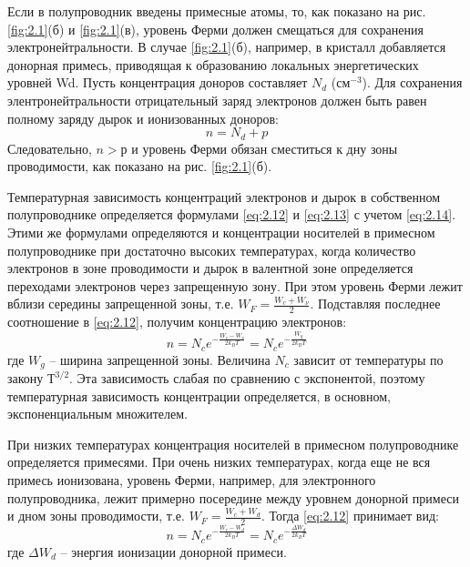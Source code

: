 Если в полупроводник введены примесные атомы, то, как показано на рис. \ref{fig:2.1}(б) и \ref{fig:2.1}(в), уровень Ферми должен смещаться для
сохранения электронейтральности. В случае \ref{fig:2.1}(б), например, в кристалл добавляется донорная примесь, приводящая к
образованию локальных энергетических уровней Wd. Пусть концентрация доноров составляет $N_d$ (см$^{-3}$). Для сохранения
элентронейтральности отрицательный заряд электронов должен быть равен полному заряду дырок и ионизованных доноров:
\begin{equation}
	n = N_d+p
	\label{eq:2.15}
\end{equation}
Следовательно, $n>р$ и уровень Ферми обязан сместиться к дну зоны проводимости, как показано на рис. \ref{fig:2.1}(б).

Температурная зависимость концентраций электронов и дырок в собственном полупроводнике определяется формулами \eqref{eq:2.12} и \eqref{eq:2.13} с учетом
\eqref{eq:2.14}. Этими же формулами определяются и концентрации носителей в примесном полупроводнике при достаточно высоких
температурах, когда количество электронов в зоне проводимости и дырок в валентной зоне определяется переходами
электронов через запрещенную зону. При этом уровень Ферми лежит вблизи середины запрещенной зоны, т.е. $W_F =
\frac{W_c+W_{\nu}}{2}$. Подставляя последнее соотношение в \eqref{eq:2.12}, получим концентрацию электронов:
\begin{equation}
	n=N_{c} e^{-\frac{W_{c}-W_{v}}{2 k_{B} T}}=N_{c} e^{-\frac{W_{g}}{2 k_{B} T}}
	\label{eq:2.16}
\end{equation}
где $W_g$  – ширина запрещенной зоны. Величина $N_c$ зависит от температуры по закону $Т^{3/2}$. Эта зависимость слабая по
сравнению с экспонентой, поэтому температурная зависимость концентрации определяется, в основном, экспоненциальным
множителем. 

При низких температурах концентрация носителей в примесном полупроводнике определяется примесями. При очень низких
температурах, когда еще не вся примесь ионизована, уровень Ферми, например, для электронного полупроводника, лежит
примерно посередине между уровнем донорной примеси и дном зоны проводимости, т.е. $W_F = \frac{W_c+W_{d}}{2}$. Тогда \eqref{eq:2.12}
принимает вид: 
\begin{equation}
	n=N_{c} e^{-\frac{W_{c}-W_{d}}{2 k_{B} T}}=N_{c} e^{-\frac{\Delta W_{d}}{2 k_{B} T}}
	\label{eq:2.17}
\end{equation}
где $\Delta W_d$ – энергия ионизации донорной примеси. 


